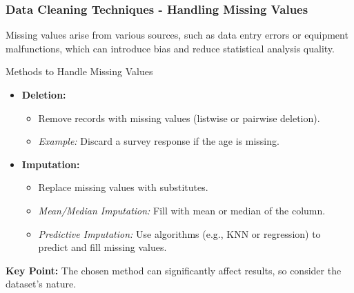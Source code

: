 \documentclass{beamer}
\begin{document}
\begin{frame}[fragile]
    \frametitle{Data Cleaning Techniques - Handling Missing Values}
    Missing values arise from various sources, such as data entry errors or equipment malfunctions, which can introduce bias and reduce statistical analysis quality.  

    \begin{block}{Methods to Handle Missing Values}
        \begin{itemize}
            \item \textbf{Deletion:} 
            \begin{itemize}
                \item Remove records with missing values (listwise or pairwise deletion).
                \item \textit{Example:} Discard a survey response if the age is missing.
            \end{itemize}
            \item \textbf{Imputation:} 
            \begin{itemize}
                \item Replace missing values with substitutes.
                \item \textit{Mean/Median Imputation:} Fill with mean or median of the column.
                \item \textit{Predictive Imputation:} Use algorithms (e.g., KNN or regression) to predict and fill missing values.
            \end{itemize}
        \end{itemize}
    \end{block}
    
    \textbf{Key Point:} The chosen method can significantly affect results, so consider the dataset's nature.
\end{frame}
\end{document}
